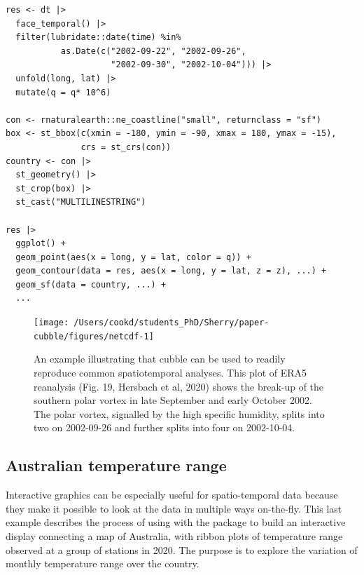 \documentclass[
  shortnames]{jss}
\begin{document}
\begin{verbatim}
res <- dt |> 
  face_temporal() |> 
  filter(lubridate::date(time) %in% 
           as.Date(c("2002-09-22", "2002-09-26",
                     "2002-09-30", "2002-10-04"))) |>
  unfold(long, lat) |> 
  mutate(q = q* 10^6)

con <- rnaturalearth::ne_coastline("small", returnclass = "sf")
box <- st_bbox(c(xmin = -180, ymin = -90, xmax = 180, ymax = -15), 
               crs = st_crs(con)) 
country <- con |> 
  st_geometry() |> 
  st_crop(box) |> 
  st_cast("MULTILINESTRING")

res |> 
  ggplot() +
  geom_point(aes(x = long, y = lat, color = q)) + 
  geom_contour(data = res, aes(x = long, y = lat, z = z), ...) +
  geom_sf(data = country, ...) +
  ...
\end{verbatim}

\begin{CodeChunk}
\begin{figure}

{\centering \texttt{[image: /Users/cookd/students\_PhD/Sherry/paper-cubble/figures/netcdf-1]} 

}

\caption[An example illustrating that cubble can be used to readily reproduce common spatiotemporal analyses]{An example illustrating that cubble can be used to readily reproduce common spatiotemporal analyses. This plot of ERA5 reanalysis (Fig. 19, Hersbach et al, 2020) shows the break-up of the southern polar vortex in late September and early October 2002. The polar vortex, signalled by the high specific humidity, splits into two on 2002-09-26 and further splits into four on 2002-10-04.}\label{fig:netcdf}
\end{figure}
\end{CodeChunk}

\hypertarget{australian-temperature-range}{%
\subsection{Australian temperature range}\label{australian-temperature-range}}

Interactive graphics can be especially useful for spatio-temporal data because they make it possible to look at the data in multiple ways on-the-fly. This last example describes the process of using
 with the  package to build an interactive display connecting a map of Australia, with ribbon plots of temperature range observed at a group of stations in 2020. The purpose is to explore the variation of monthly temperature range over the country.
\end{document}
